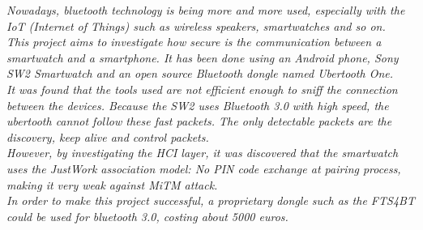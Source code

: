 \textit{ Nowadays, bluetooth technology is being more and more used, especially with the IoT (Internet of Things) such as wireless speakers, smartwatches and so on.}\\
\textit{This project aims to investigate how secure is the communication between a smartwatch and a smartphone. It has been done using an Android phone, Sony SW2 Smartwatch and an open source Bluetooth dongle named Ubertooth One.}\\

\textit{It was found that the tools used are not efficient enough to sniff the connection between the devices. Because the SW2 uses Bluetooth 3.0 with high speed, the ubertooth cannot follow these fast packets. The only detectable packets are the discovery, keep alive and control packets.}\\
\textit{However, by investigating the HCI layer, it was discovered that the smartwatch uses the JustWork association model: No PIN code exchange at pairing process, making it very weak against MiTM attack.}\\

\textit{In order to make this project successful, a proprietary dongle such as the FTS4BT could be used for bluetooth 3.0, costing about 5000 euros. }